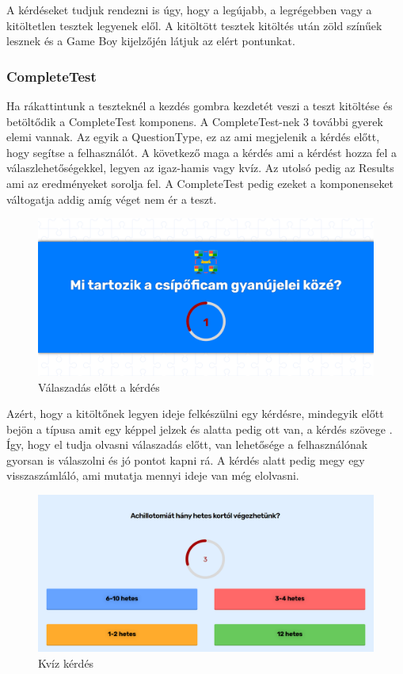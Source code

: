 A kérdéseket tudjuk rendezni is úgy, hogy a legújabb, a legrégebben vagy a kitöltetlen tesztek legyenek elől.
A kitöltött tesztek kitöltés után zöld színűek lesznek és a Game Boy kijelzőjén látjuk az elért pontunkat.

\subsubsection{CompleteTest}

Ha rákattintunk a teszteknél a kezdés gombra kezdetét veszi a teszt kitöltése és betöltődik a CompleteTest komponens. A CompleteTest-nek 3 további gyerek elemi vannak. Az egyik a QuestionType, ez az ami megjelenik a kérdés előtt, hogy segítse a felhasználót. A következő maga a kérdés ami a kérdést hozza fel a válaszlehetőségekkel, legyen az igaz-hamis vagy kvíz. Az utolsó pedig az Results ami az eredményeket sorolja fel. A CompleteTest pedig ezeket a komponenseket váltogatja addig amíg véget nem ér a teszt.

\begin{figure}[H]
    \centering
    \includegraphics[width=\linewidth]{images/question_type.png}
    \caption{Válaszadás előtt a kérdés}
    \label{fig:question_type}
\end{figure}

Azért, hogy a kitöltőnek legyen ideje felkészülni egy kérdésre, mindegyik előtt bejön a típusa amit egy képpel jelzek és alatta pedig ott van, a kérdés szövege . Így, hogy el tudja olvasni válaszadás előtt, van lehetősége a felhasználónak gyorsan is válaszolni és jó pontot kapni rá. A kérdés alatt pedig megy egy visszaszámláló, ami mutatja mennyi ideje van még elolvasni.

\begin{figure}[H]
    \centering
    \includegraphics[width=\linewidth]{images/question1.png}
    \caption{Kvíz kérdés}
    \label{fig:question1}
\end{figure}


